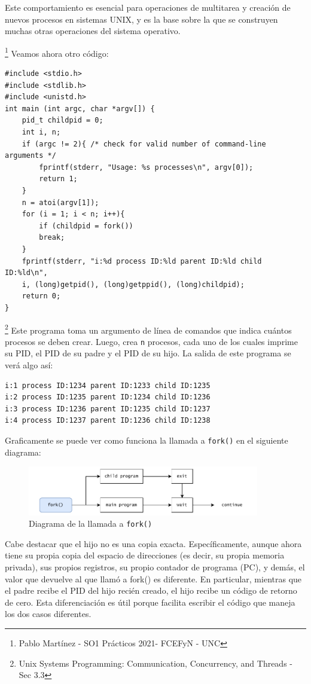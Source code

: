 \documentclass{article}
\begin{document}
Este comportamiento es esencial para operaciones de multitarea y creación de nuevos procesos en sistemas UNIX, y es la base sobre la que se construyen muchas otras operaciones del sistema operativo.

\footnote{Pablo Martínez - SO1 Prácticos 2021- FCEFyN - UNC}
Veamos ahora otro código:
\begin{verbatim}
#include <stdio.h>
#include <stdlib.h>
#include <unistd.h>
int main (int argc, char *argv[]) {
    pid_t childpid = 0;
    int i, n;
    if (argc != 2){ /* check for valid number of command-line arguments */
        fprintf(stderr, "Usage: %s processes\n", argv[0]);
        return 1;
    }
    n = atoi(argv[1]);
    for (i = 1; i < n; i++){
        if (childpid = fork())
        break;
    }
    fprintf(stderr, "i:%d process ID:%ld parent ID:%ld child ID:%ld\n",
    i, (long)getpid(), (long)getppid(), (long)childpid);
    return 0;
}
\end{verbatim}

\footnote{Unix Systems Programming: Communication, Concurrency, and Threads - Sec 3.3}
Este programa toma un argumento de línea de comandos que indica cuántos procesos se deben crear. Luego, crea \texttt{n} procesos, cada uno de los cuales imprime su PID, el PID de su padre y el PID de su hijo. La salida de este programa se verá algo así:

\begin{verbatim}
i:1 process ID:1234 parent ID:1233 child ID:1235
i:2 process ID:1235 parent ID:1234 child ID:1236
i:3 process ID:1236 parent ID:1235 child ID:1237
i:4 process ID:1237 parent ID:1236 child ID:1238
\end{verbatim}

Graficamente se puede ver como funciona la llamada a \texttt{fork()} en el siguiente diagrama:

\begin{figure}[h]
    \centering
    \includegraphics[width=0.9\textwidth]{src/fork.pdf}
    \caption{Diagrama de la llamada a \texttt{fork()}}
\end{figure}

Cabe destacar que el hijo no es una copia exacta. Específicamente, aunque ahora tiene su propia copia del espacio de direcciones (es decir, su propia memoria privada), sus propios registros, su propio contador de programa (PC), y demás, el valor que devuelve al que llamó a fork() es diferente. En particular, mientras que el padre recibe el PID del hijo recién creado, el hijo recibe un código de retorno de cero. Esta diferenciación es útil porque facilita escribir el código que maneja los dos casos diferentes.
\end{document}
